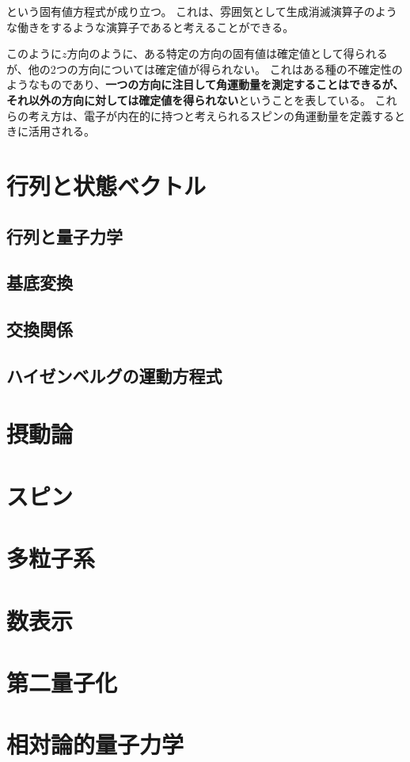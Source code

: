 \documentclass[a4paper]{jsreport}
\begin{document}
            という固有値方程式が成り立つ。
            これは、雰囲気として生成消滅演算子のような働きをするような演算子であると考えることができる。\par
            このように$z$方向のように、ある特定の方向の固有値は確定値として得られるが、他の2つの方向については確定値が得られない。
            これはある種の不確定性のようなものであり、\textbf{一つの方向に注目して角運動量を測定することはできるが、それ以外の方向に対しては確定値を得られない}ということを表している。
            これらの考え方は、電子が内在的に持つと考えられるスピンの角運動量を定義するときに活用される。

    \chapter{行列と状態ベクトル}
        \section{行列と量子力学}
        \section{基底変換}

        \section{交換関係}

        \section{ハイゼンベルグの運動方程式}

    \chapter{摂動論}
    \chapter{スピン}
    \chapter{多粒子系}
    \chapter{数表示}
    \chapter{第二量子化}
    \chapter{相対論的量子力学}
        
\end{document}
